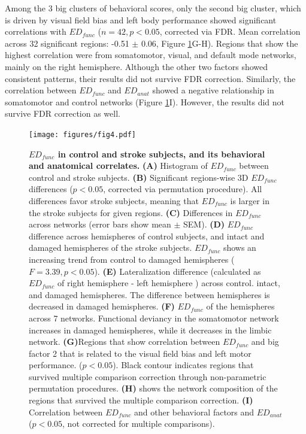 \documentclass[fleqn,10pt]{wlscirep}
\begin{document}
Among the 3 big clusters of behavioral scores, only the second big cluster, which is driven by visual field bias and left body performance showed significant correlations with $\textit{ED}_{{func}}$ ($ n = 42, p < 0.05$, corrected via FDR. Mean correlation across 32 significant regions: -0.51 $\pm$ 0.06, Figure \ref{fig:fig4}G-H). Regions that show the highest correlation were from somatomotor, visual, and default mode networks, mainly on the right hemisphere. Although the other two factors showed consistent patterns, their results did not survive FDR correction. Similarly, the correlation between $\textit{ED}_{{func}}$ and $\textit{ED}_{{anat}}$ showed a negative relationship in somatomotor and control networks (Figure \ref{fig:fig4}I). However, the results did not survive FDR correction as well.
\begin{figure}[]
\centering
\texttt{[image: figures/fig4.pdf]}
\caption{\label{fig:fig4} \textbf{$\textit{ED}_{{func}}$ in control and stroke subjects, and its behavioral and anatomical correlates. }  \textbf{(A)} Histogram of $\textit{ED}_{{func}}$ between control and stroke subjects. \textbf{(B)} Significant regions-wise 3D $\textit{ED}_{{func}}$ differences ($p < 0.05$, corrected via permutation procedure). All differences favor stroke subjects, meaning that $\textit{ED}_{{func}}$ is larger in the stroke subjects for given regions. \textbf{(C) }Differences in $\textit{ED}_{{func}}$ across networks (error bars show mean $\pm$ SEM). \textbf{(D)} $\textit{ED}_{{func}}$ difference across hemispheres of control subjects, and intact and damaged hemispheres of the stroke subjects. $\textit{ED}_{{func}}$ shows an increasing trend from control to damaged hemispheres ($ F = 3.39, p < 0.05 $). \textbf{(E)} Lateralization difference (calculated as $\textit{ED}_{{func}}$ of right hemisphere - left hemisphere ) across control. intact, and damaged hemispheres. The difference between hemispheres is decreased in damaged hemispheres. \textbf{(F)} $\textit{ED}_{{func}}$ of the hemispheres across 7 networks. Functional deviancy in the somatomotor network increases in damaged hemispheres, while it decreases in the limbic network. \textbf{(G)}Regions that show correlation between $\textit{ED}_{{func}}$ and big factor 2 that is related to the visual field bias and left motor performance. ($p < 0.05$). Black contour indicates regions that survived multiple comparison correction  through non-parametric permutation procedures. \textbf{(H)} shows the network composition of the regions that survived the multiple comparison correction. \textbf{(I)} Correlation between $\textit{ED}_{{func}}$ and other behavioral factors and $\textit{ED}_{{anat}}$ ($p < 0.05$, not corrected for multiple comparisons). }
\end{figure}
\end{document}
